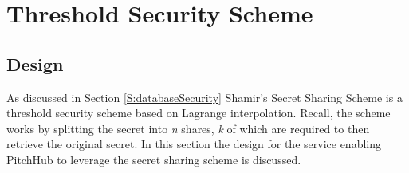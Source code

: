 \chapter{Threshold Security Scheme}\label{C:threshholdSecurity}

\section{Design}
As discussed in Section \ref{S:databaseSecurity} Shamir's Secret Sharing Scheme is a threshold security scheme based on Lagrange interpolation. Recall, the scheme works by splitting the secret into \textit{n} shares, \textit{k} of which are required to then retrieve the original secret. In this section the design for the service enabling PitchHub to leverage the secret sharing scheme is discussed.

